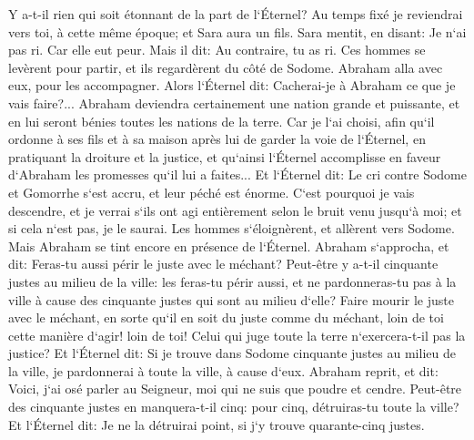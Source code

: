 \verse Y a-t-il rien qui soit étonnant de la part de l`Éternel? Au temps fixé je reviendrai vers toi, à cette même époque; et Sara aura un fils. 
\verse Sara mentit, en disant: Je n`ai pas ri. Car elle eut peur. Mais il dit: Au contraire, tu as ri. 
\verse Ces hommes se levèrent pour partir, et ils regardèrent du côté de Sodome. Abraham alla avec eux, pour les accompagner. 
\verse Alors l`Éternel dit: Cacherai-je à Abraham ce que je vais faire?... 
\verse Abraham deviendra certainement une nation grande et puissante, et en lui seront bénies toutes les nations de la terre. 
\verse Car je l`ai choisi, afin qu`il ordonne à ses fils et à sa maison après lui de garder la voie de l`Éternel, en pratiquant la droiture et la justice, et qu`ainsi l`Éternel accomplisse en faveur d`Abraham les promesses qu`il lui a faites... 
\verse Et l`Éternel dit: Le cri contre Sodome et Gomorrhe s`est accru, et leur péché est énorme. 
\verse C`est pourquoi je vais descendre, et je verrai s`ils ont agi entièrement selon le bruit venu jusqu`à moi; et si cela n`est pas, je le saurai. 
\verse Les hommes s`éloignèrent, et allèrent vers Sodome. Mais Abraham se tint encore en présence de l`Éternel. 
\verse Abraham s`approcha, et dit: Feras-tu aussi périr le juste avec le méchant? 
\verse Peut-être y a-t-il cinquante justes au milieu de la ville: les feras-tu périr aussi, et ne pardonneras-tu pas à la ville à cause des cinquante justes qui sont au milieu d`elle? 
\verse Faire mourir le juste avec le méchant, en sorte qu`il en soit du juste comme du méchant, loin de toi cette manière d`agir! loin de toi! Celui qui juge toute la terre n`exercera-t-il pas la justice? 
\verse Et l`Éternel dit: Si je trouve dans Sodome cinquante justes au milieu de la ville, je pardonnerai à toute la ville, à cause d`eux. 
\verse Abraham reprit, et dit: Voici, j`ai osé parler au Seigneur, moi qui ne suis que poudre et cendre. 
\verse Peut-être des cinquante justes en manquera-t-il cinq: pour cinq, détruiras-tu toute la ville? Et l`Éternel dit: Je ne la détruirai point, si j`y trouve quarante-cinq justes. 
